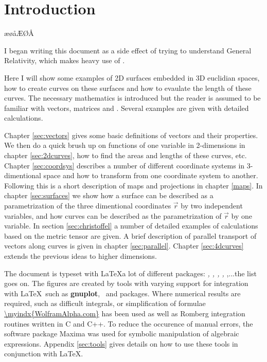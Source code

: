 \chapter{Introduction}

æøåÆØÅ

I began writing this document as a side effect of trying to understand General Relativity, which makes 
heavy use of .

Here I will show some examples of 2D surfaces embedded in 3D euclidian spaces, how to create 
curves on these surfaces and how to evaulate the length of these curves. The necessary 
mathematics is introduced but the reader is assumed to be familiar with vectors, matrices and 
. Several examples are given with detailed calculations.


Chapter \ref{sec:vectors} gives some basic definitions of vectors and their properties. 
We then do a quick brush up on functions of one variable in 2-dimensions in chapter \ref{sec:2dcurves}, 
how to find the areas and lengths of these curves, etc. 
Chapter \ref{sec:coordsys} describes a number of different coordinate systems in 3-dimentional 
space and how to transform from one coordinate system to another. Following this is a short 
description of maps and projections in chapter \ref{maps}.
In chapter \ref{sec:surfaces} we show how a surface can be described as a parametrization of the 
three dimentional coordinates $\vec{r}$ by two independent variables, and how curves can be 
described as the parametrization of $\vec{r}$ by one variable. In section \ref{sec:christoffel} a 
number of detailed examples of calculations based on the metric
tensor are given.
A brief description of parallel transport of vectors along curves is given in chapter \ref{sec:parallel}. 
Chapter \ref{sec:4dcurves} extends the previous ideas to higher dimensions.

\vspace{0.5cm}
The document is typeset with \LaTeX a lot of different packages: \emph{, , 
, ,
},...the list goes on. The figures are created by tools with varying support for 
integration with \LaTeX\ such as \textbf{gnuplot}, \TikZ\, \emph{} and \emph{} packages. 
Where numerical results are required, such as difficult 
integrals, or simplification of formulae \url{\myindx{WolframAlpha.com}} has been used as 
well as Romberg integration 
routines written in C and C++. To reduce the occurence of manual errors, the software package Maxima 
was used for symbolic manipulation of algebraic expressions. Appendix \ref{sec:tools} gives details
on how to use these tools in conjunction with \LaTeX.


